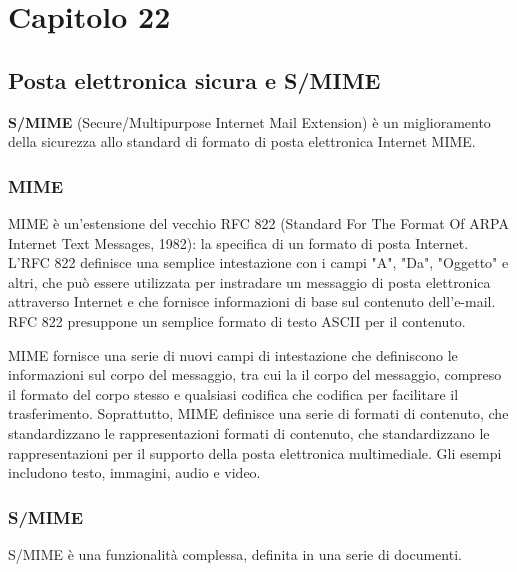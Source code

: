 \chapter*{Capitolo 22}
\section{Posta elettronica sicura e S/MIME}
\textbf{S/MIME} (Secure/Multipurpose Internet Mail Extension) è un miglioramento della sicurezza allo standard di formato di posta elettronica Internet MIME.
\subsection{MIME}
MIME è un'estensione del vecchio RFC 822 (Standard For The Format Of ARPA Internet Text Messages, 1982): la specifica di un formato di posta Internet. L'RFC 822 definisce una semplice intestazione con i campi "A", "Da", "Oggetto" e altri, che può essere utilizzata per instradare un messaggio di posta elettronica attraverso Internet e che fornisce informazioni di base sul contenuto dell'e-mail. RFC 822 presuppone un semplice formato di testo ASCII per il contenuto. 

\singlespacing

MIME fornisce una serie di nuovi campi di intestazione che definiscono le informazioni sul corpo del messaggio, tra cui la il corpo del messaggio, compreso il formato del corpo stesso e qualsiasi codifica che codifica per facilitare il trasferimento. Soprattutto, MIME definisce una serie di formati di contenuto, che standardizzano le rappresentazioni formati di contenuto, che standardizzano le rappresentazioni per il supporto della posta elettronica multimediale. Gli esempi includono testo, immagini, audio e video.

\subsection{S/MIME}
S/MIME è una funzionalità complessa, definita in una serie di documenti. 

\singlespacing

